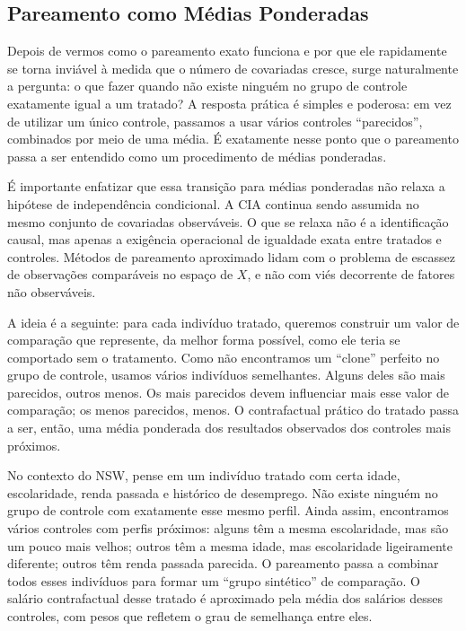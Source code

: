 \subsection{Pareamento como Médias Ponderadas}

Depois de vermos como o pareamento exato funciona e por que ele rapidamente se torna inviável à medida que o número de covariadas cresce, surge naturalmente a pergunta: o que fazer quando não existe ninguém no grupo de controle exatamente igual a um tratado? A resposta prática é simples e poderosa: em vez de utilizar um único controle, passamos a usar vários controles ``parecidos'', combinados por meio de uma média. É exatamente nesse ponto que o pareamento passa a ser entendido como um procedimento de médias ponderadas.

É importante enfatizar que essa transição para médias ponderadas não relaxa a hipótese de independência condicional. A CIA continua sendo assumida no mesmo conjunto de covariadas observáveis. O que se relaxa não é a identificação causal, mas apenas a exigência operacional de igualdade exata entre tratados e controles. Métodos de pareamento aproximado lidam com o problema de escassez de observações comparáveis no espaço de $X$, e não com viés decorrente de fatores não observáveis.

A ideia é a seguinte: para cada indivíduo tratado, queremos construir um valor de comparação que represente, da melhor forma possível, como ele teria se comportado sem o tratamento. Como não encontramos um “clone” perfeito no grupo de controle, usamos vários indivíduos semelhantes. Alguns deles são mais parecidos, outros menos. Os mais parecidos devem influenciar mais esse valor de comparação; os menos parecidos, menos. O contrafactual prático do tratado passa a ser, então, uma média ponderada dos resultados observados dos controles mais próximos.

No contexto do NSW, pense em um indivíduo tratado com certa idade, escolaridade, renda passada e histórico de desemprego. Não existe ninguém no grupo de controle com exatamente esse mesmo perfil. Ainda assim, encontramos vários controles com perfis próximos: alguns têm a mesma escolaridade, mas são um pouco mais velhos; outros têm a mesma idade, mas escolaridade ligeiramente diferente; outros têm renda passada parecida. O pareamento passa a combinar todos esses indivíduos para formar um “grupo sintético” de comparação. O salário contrafactual desse tratado é aproximado pela média dos salários desses controles, com pesos que refletem o grau de semelhança entre eles.

